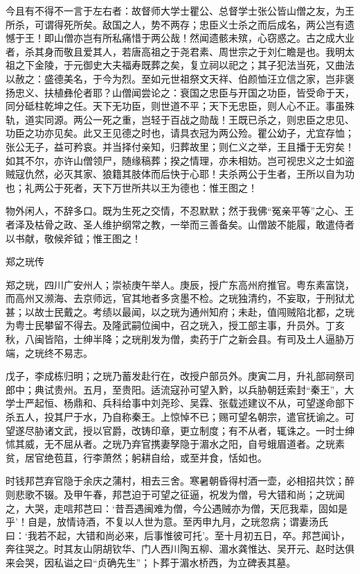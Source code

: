 \documentclass[]{article}
\begin{document}
今且有不得不一言于左右者：故督师大学士瞿公、总督学士张公皆山僧之友，为王所杀，可谓得死所矣。敌国之人，势不两存；忠臣义士杀之而后成名，两公岂有遗憾于王！即山僧亦岂有所私痛惜于两公哉！然闻遗骸未殡，心窃惑之。古之成大业者，杀其身而敬且爱其人，若唐高祖之于尧君素、周世宗之于刘仁瞻是也。我明太祖之下金陵，于元御史大夫福寿既葬之矣，复立祠以祀之；其子犯法当死，又曲法以赦之：盛德美名，于今为烈。至如元世祖祭文天祥、伯颜恤汪立信之家，岂非褒扬忠义、扶植彝伦者耶？山僧闻尝论之：衰国之忠臣与开国之功臣，皆受命于天，同分砥柱乾坤之任。天下无功臣，则世道不平；天下无忠臣，则人心不正。事虽殊轨，道实同源。两公一死之重，岂轻于百战之勋哉！王既已杀之，则忠臣之忠见、功臣之功亦见矣。此又王见德之时也，请具衣冠为两公殓。瞿公幼子，尤宜存恤；张公无子，益可矜哀。并当择付亲知，归葬故里；则仁义之举，王且播于无穷矣！如其不尔，亦许山僧领尸，随缘稿葬；揆之情理，亦未相妨。岂可视忠义之士如盗贼寇仇然，必灭其家、狼籍其肢体而后快于心耶！夫杀两公于生者，王所以自为功也；礼两公于死者，天下万世所共以王为德也：惟王图之！

物外闲人，不辞多口。既为生死之交情，不忍默默；然于我佛``冤亲平等''之心、王者泽及枯骨之政、圣人维护纲常之教，一举而三善备矣。山僧跛不能履，敢遣侍者以书献，敬候斧钺；惟王图之！

郑之珖传

郑之珖，四川广安州人；崇祯庚午举人。庚辰，授广东高州府推官。粤东素富饶，而高州又濒海、去京师远，官其地者多贪墨不检。之珖独清约，不妄取，于刑狱尤甚；以故士民戴之。考绩以最闻，以之珖为通州知府；未赴，值闯贼陷北都，之珖为粤士民攀留不得去。及隆武嗣位闽中，召之珖入，授工部主事，升员外。丁亥秋，八闽皆陷，士绅半降；之珖削发为僧，卖药于广之新会县。有司及土人逼胁万端，之珖终不易志。

戊子，李成栋归明；之珖乃蓄发赴行在，改授户部员外。庚寅二月，升礼部祠祭司郎中；典试贵州。五月，至贵阳。适流寇孙可望入黔，以兵胁朝廷索封``秦王''，大学士严起恒、杨鼎和、兵科给事中刘尧珍、吴霖、张载述建议不从，可望遂命部下杀五人，投其尸于水，乃自称秦王。上惊悼不已；赐可望名朝宗，遣官抚谕之。可望遂尽胁诸文武，授以官爵，改铸印章，更立制度；有不从者，辄诛之。一时士绅怵其威，无不屈从者。之珖乃弃官携妻孥隐于湄水之阳，自号蛾眉道者。之珖素贫，居官绝苞苴，行李萧然；躬耕自给，或至并食，恬如也。

时钱邦芑弃官隐于余庆之蒲村，相去三舍。寒暑朝昏得村酒一壶，必相招共饮；醉则悲歌不辍。及甲午春，邦芑迫于可望之征逼，祝发为僧，号大错和尚；之珖闻之，大哭，走唁邦芑曰：`昔吾遇闽难为僧，今公遇贼亦为僧，天厄我辈，固如是乎'！自是，放情诗酒，不复以人世为意。至丙申九月，之珖忽病；谓妻汤氏曰：`我若不起，大错和尚必来，后事惟彼可托'。至十月初五日，卒。邦芑闻讣，奔往哭之。时其友山阴胡钦华、门人西川陶五柳、湄水龚惟达、吴开元、赵时达俱来会哭，因私谥之曰``贞确先生''；卜葬于湄水桥西，为立碑表其墓。
\end{document}
